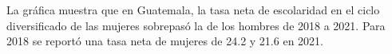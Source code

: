 La gráfica muestra que en Guatemala, la tasa neta de escolaridad en el ciclo diversificado de las mujeres sobrepasó la de los hombres de 2018 a 2021. Para 2018 se reportó una tasa neta de mujeres de 24.2 y 21.6 en 2021.